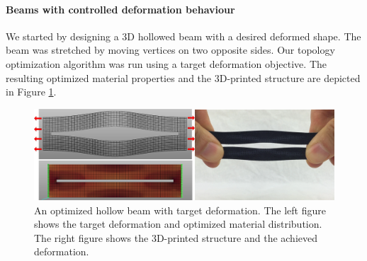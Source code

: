 		\paragraph{Beams with controlled deformation behaviour}
		We started by designing a 3D hollowed beam with a desired deformed shape. The beam was stretched by moving vertices on two opposite sides. Our topology optimization algorithm was run using a target deformation objective. The resulting optimized material properties and the 3D-printed structure are depicted in Figure \ref{fig:beam}. 
		\begin{figure}[h!]
			\centering
			\includegraphics[width=.8\linewidth]{images/bar2_two.png}
			\caption{
				An optimized hollow beam with target deformation. The left figure shows the target deformation and optimized material distribution. The right figure shows the 3D-printed structure and the achieved deformation.
				\label{fig:beam}}
		\end{figure}
